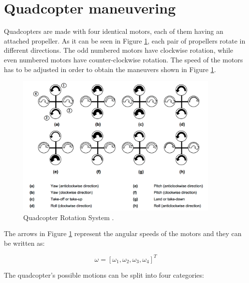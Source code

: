 \section{Quadcopter maneuvering}
Quadcopters are made with four identical motors, each of them having an attached propeller. As it can be seen in Figure \ref{rollpitchyaw}, each pair of propellers rotate in different directions. The odd numbered motors have clockwise rotation, while even numbered motors have counter-clockwise rotation. The speed of the motors has to be adjusted in order to obtain the maneuvers shown in Figure \ref{rollpitchyaw}. 

\begin{figure}[H]
  \centering
    \includegraphics[width=0.9\textwidth]{images/rollpitchyaw.png}
	\caption{Quadcopter Rotation System \cite{RPYFig}.}
	\label{rollpitchyaw}
\end{figure}

The arrows in Figure \ref{rollpitchyaw} represent the angular speeds of the motors and they can be written as:

\begin{equation}
	\omega=[\omega_{1}, \omega_{2}, \omega_{3}, \omega_{4}] ^{T}
\end{equation} 

The quadcopter's possible motions can be split into four categories:

